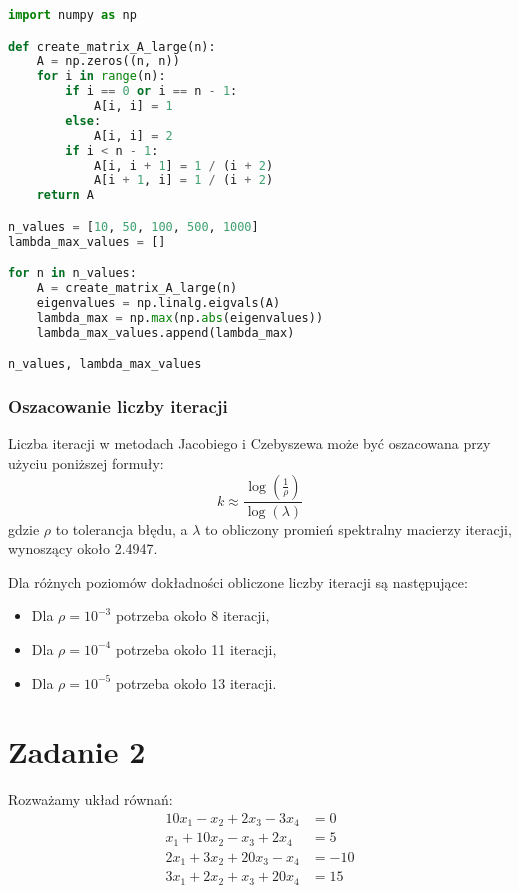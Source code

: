 \documentclass{article}
\begin{document}
\begin{lstlisting}[language=Python]
import numpy as np

def create_matrix_A_large(n):
    A = np.zeros((n, n))
    for i in range(n):
        if i == 0 or i == n - 1:
            A[i, i] = 1
        else:
            A[i, i] = 2
        if i < n - 1:
            A[i, i + 1] = 1 / (i + 2)
            A[i + 1, i] = 1 / (i + 2)
    return A

n_values = [10, 50, 100, 500, 1000]
lambda_max_values = []

for n in n_values:
    A = create_matrix_A_large(n)
    eigenvalues = np.linalg.eigvals(A)
    lambda_max = np.max(np.abs(eigenvalues))
    lambda_max_values.append(lambda_max)

n_values, lambda_max_values
\end{lstlisting}
\newpage
\subsubsection*{Oszacowanie liczby iteracji}
Liczba iteracji w metodach Jacobiego i Czebyszewa może być oszacowana przy użyciu poniższej formuły:
\[
k \approx \frac{\log\left(\frac{1}{\rho}\right)}{\log(\lambda)}
\]
gdzie \( \rho \) to tolerancja błędu, a \( \lambda \) to obliczony promień spektralny macierzy iteracji, wynoszący około 2.4947.

Dla różnych poziomów dokładności obliczone liczby iteracji są następujące:
\begin{itemize}
    \item Dla \( \rho = 10^{-3} \) potrzeba około 8 iteracji,
    \item Dla \( \rho = 10^{-4} \) potrzeba około 11 iteracji,
    \item Dla \( \rho = 10^{-5} \) potrzeba około 13 iteracji.
\end{itemize}

\section*{Zadanie 2}

Rozważamy układ równań:
\begin{align*}
10x_1 - x_2 + 2x_3 - 3x_4 &= 0 \\
x_1 + 10x_2 - x_3 + 2x_4 &= 5 \\
2x_1 + 3x_2 + 20x_3 - x_4 &= -10 \\
3x_1 + 2x_2 + x_3 + 20x_4 &= 15
\end{align*}
\end{document}
